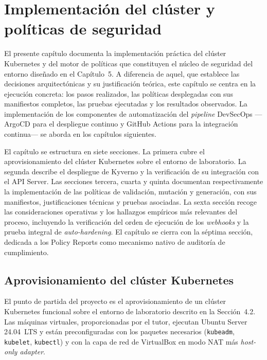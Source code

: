 \chapter{Implementación del clúster y políticas de seguridad}

El presente capítulo documenta la implementación práctica del clúster Kubernetes y del motor de políticas que constituyen el núcleo de seguridad del entorno diseñado en el Capítulo~5. A diferencia de aquel, que establece las decisiones arquitectónicas y su justificación teórica, este capítulo se centra en la ejecución concreta: los pasos realizados, las políticas desplegadas con sus manifiestos completos, las pruebas ejecutadas y los resultados observados. La implementación de los componentes de automatización del \textit{pipeline} DevSecOps —ArgoCD para el despliegue continuo y GitHub Actions para la integración continua— se aborda en los capítulos siguientes.

El capítulo se estructura en siete secciones. La primera cubre el aprovisionamiento del clúster Kubernetes sobre el entorno de laboratorio. La segunda describe el despliegue de Kyverno y la verificación de su integración con el API Server. Las secciones tercera, cuarta y quinta documentan respectivamente la implementación de las políticas de validación, mutación y generación, con sus manifiestos, justificaciones técnicas y pruebas asociadas. La sexta sección recoge las consideraciones operativas y los hallazgos empíricos más relevantes del proceso, incluyendo la verificación del orden de ejecución de los \textit{webhooks} y la prueba integral de \textit{auto-hardening}. El capítulo se cierra con la séptima sección, dedicada a los Policy Reports como mecanismo nativo de auditoría de cumplimiento.

\section{Aprovisionamiento del clúster Kubernetes}

El punto de partida del proyecto es el aprovisionamiento de un clúster Kubernetes funcional sobre el entorno de laboratorio descrito en la Sección~4.2. Las máquinas virtuales, proporcionadas por el tutor, ejecutan Ubuntu Server 24.04~LTS y están preconfiguradas con los paquetes necesarios (\texttt{kubeadm}, \texttt{kubelet}, \texttt{kubectl}) y con la capa de red de VirtualBox en modo NAT más \textit{host-only adapter}.

